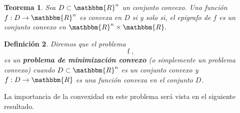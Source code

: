 \documentclass[a4paper,12pt]{report}
\newcommand{\RR}{\mathbbm{R}}
\newcommand{\Rn}{\RR^n}
\newcommand{\mini}{\mathop{\mathrm{minimizar}}_{x\in D}f(x)}
\newcommand{\arr}{\rightarrow}
\newtheorem{teo}{Teorema}[section]
\newtheorem{defi}[teo]{Definici\'on}
\newenvironment{dem}{\vspace*{-0.1cm}{\it Demostraci\'on:}}{\hfill
$\blacksquare$\\}
\begin{document}
\begin{teo}\label{epigrafo}
Sea $D\subset\Rn$ un conjunto convexo. Una funci\'on $f:D\arr\Rn$ es convexa en $D$ si y solo si, el epigrafo de $f$ es un conjunto convexo en $\Rn \times \RR.$
\end{teo}




\begin{defi}
Diremos que el problema 
\begin{equation}\label{mincon}
\mathop{\mini}, 
\end{equation}
es un \textbf{problema de minimizaci\'on convexo} (o simplemente un problema convexo) cuando $D\subset\Rn$ es un conjunto convexo y $f:D\arr\RR$ es una funci\'on convexa en el conjunto $D$.
\end{defi}

La importancia de la convexidad en este problema ser\'a vista en el siguiente resultado.
\end{document}
